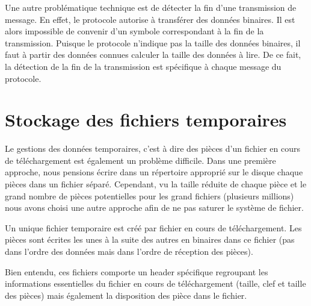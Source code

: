 Une autre problématique technique est de détecter la fin d'une transmission de message. En effet, le protocole autorise à transférer des données binaires. Il est alors impossible de convenir d'un symbole correspondant à la fin de la transmission. Puisque le protocole n'indique pas la taille des données binaires, il faut à partir des données connues calculer la taille des données à lire. De ce fait, la détection de la fin de la transmission est spécifique à chaque message du protocole.

\section{Stockage des fichiers temporaires}

Le gestions des données temporaires, c'est à dire des pièces d'un fichier en cours de téléchargement est également un problème difficile. Dans une première approche, nous pensions écrire dans un répertoire approprié sur le disque chaque pièces dans un fichier séparé. Cependant, vu la taille réduite de chaque pièce et le grand nombre de pièces potentielles pour les grand fichiers (plusieurs millions) nous avons choisi une autre approche afin de ne pas saturer le système de fichier.

Un unique fichier temporaire est créé par fichier en cours de téléchargement. Les pièces sont écrites les unes à la suite des autres en binaires dans ce fichier (pas dans l'ordre des données mais dans l'ordre de réception des pièces).
 
Bien entendu, ces fichiers comporte un header spécifique regroupant les informations essentielles du fichier en cours de téléchargement (taille, clef et taille des pièces) mais également la disposition des pièce dans le fichier.


